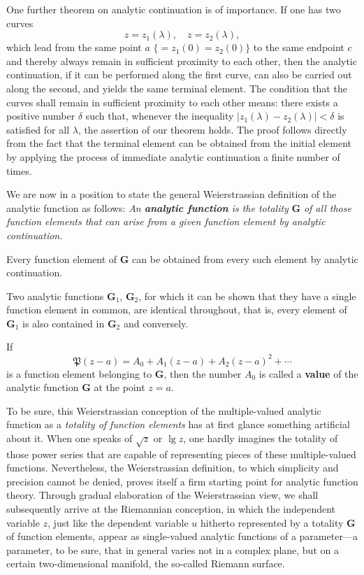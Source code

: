 \documentclass{article}
\begin{document}
One further theorem on analytic continuation is of importance. If one has two curves
\[ z = z_1(\lambda), \quad z = z_2(\lambda), \]
which lead from the same point $a$ $\{ = z_1(0) = z_2(0) \}$ to the same endpoint $c$ and thereby always remain in sufficient proximity to each other, then the analytic continuation, if it can be performed along the first curve, can also be carried out along the second, and yields the same terminal element. The condition that the curves shall remain in sufficient proximity to each other means: there exists a positive number $\delta$ such that, whenever the inequality $|z_1(\lambda) - z_2(\lambda)| < \delta$ is satisfied for all $\lambda$, the assertion of our theorem holds. The proof follows directly from the fact that the terminal element can be obtained from the initial element by applying the process of immediate analytic continuation a finite number of times.

We are now in a position to state the general Weierstrassian definition of the analytic function as follows: \emph{An \textbf{analytic function} is the totality} $\mathbf{G}$ \emph{of all those function elements that can arise from a given function element by analytic continuation.}

Every function element of $\mathbf{G}$ can be obtained from every such element by analytic continuation.

Two analytic functions $\mathbf{G}_1$, $\mathbf{G}_2$, for which it can be shown that they have a single function element in common, are identical throughout, that is, every element of $\mathbf{G}_1$ is also contained in $\mathbf{G}_2$ and conversely.

If
\[ \mathfrak{P}(z - a) = A_0 + A_1(z - a) + A_2(z - a)^2 + \cdots \]
is a function element belonging to $\mathbf{G}$, then the number $A_0$ is called a \textbf{value} of the analytic function $\mathbf{G}$ at the point $z = a$.

To be sure, this Weierstrassian conception of the multiple-valued analytic function as a \emph{totality of function elements} has at first glance something artificial about it. When one speaks of $\sqrt{z}$ or $\lg z$, one hardly imagines the totality of those power series that are capable of representing pieces of these multiple-valued functions. Nevertheless, the Weierstrassian definition, to which simplicity and precision cannot be denied, proves itself a firm starting point for analytic function theory. Through gradual elaboration of the Weierstrassian view, we shall subsequently arrive at the Riemannian conception, in which the independent variable $z$, just like the dependent variable $u$ hitherto represented by a totality $\mathbf{G}$ of function elements, appear as single-valued analytic functions of a parameter---a parameter, to be sure, that in general varies not in a complex plane, but on a certain two-dimensional manifold, the so-called Riemann surface.
\end{document}
